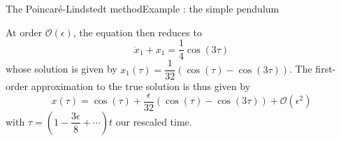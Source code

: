 \documentclass[usenames,dvipsnames,svgnames,10pt,aspectratio=169]{beamer}
\begin{document}
\begin{frame}[t, c]{The Poincaré-Lindstedt method}{Example : the simple pendulum}
  \begin{minipage}{.68\textwidth}
    At order $\mathcal{O}(\epsilon)$, the equation then reduces to
    \[
    \ddot{x}_1 + x_1 = \frac{1}{4} \cos(3\tau)
    \]
    whose solution is given by $x_1(\tau) = \dfrac{1}{32} \left( \cos(\tau) - \cos(3\tau) \right)$.
    The first-order approximation to the true solution is thus given by
    \[
    x(\tau) = \cos(\tau) + \dfrac{\epsilon}{32} \left( \cos(\tau) - \cos(3\tau)  \right) + \mathcal{O}(\epsilon^2)
    \]
    with $\tau = \left( 1 - \dfrac{3\epsilon}{8} + \cdots \right) t$ our rescaled time.
  \end{minipage}%
  \hfill
  \begin{minipage}{.28\textwidth}
    \centering
  \end{minipage}

  \vspace{1cm}
\end{frame}
\end{document}
